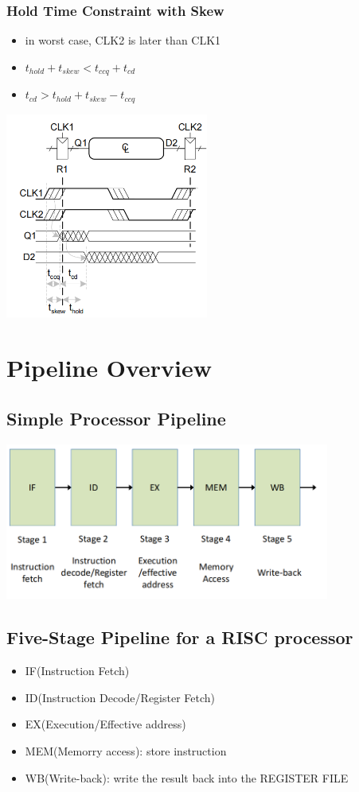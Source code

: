 \documentclass[12pt]{article}
\begin{document}
\subsubsection{Hold Time Constraint with Skew}
\begin{itemize}
    \item in worst case, CLK2 is later than CLK1
    \item $t_{hold} + t_{skew} < t_{ccq} + t_{cd}$
    \item $t_{cd} > t_{hold} + t_{skew} - t_{ccq}$
\end{itemize}
\includegraphics[width=0.5\textwidth]{ConstraintD.png}

\section{Pipeline Overview}
\subsection{Simple Processor Pipeline}
\includegraphics[width=0.8\textwidth]{SimpleProcessorPipeline.png}
\subsection{Five-Stage Pipeline for a RISC processor}
\begin{itemize}
    \item IF(Instruction Fetch)
    \item ID(Instruction Decode/Register Fetch)
    \item EX(Execution/Effective address)
    \item MEM(Memorry access): store instruction
    \item WB(Write-back): write the result back into the REGISTER FILE
\end{itemize}
\end{document}
